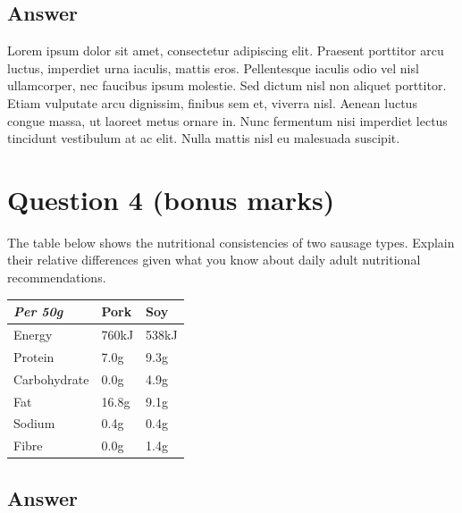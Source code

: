 \documentclass[
	12pt, %
]{fphw}
\begin{document}

\subsection*{Answer} 

Lorem ipsum dolor sit amet, consectetur adipiscing elit. Praesent porttitor arcu luctus, imperdiet urna iaculis, mattis eros. Pellentesque iaculis odio vel nisl ullamcorper, nec faucibus ipsum molestie. Sed dictum nisl non aliquet porttitor. Etiam vulputate arcu dignissim, finibus sem et, viverra nisl. Aenean luctus congue massa, ut laoreet metus ornare in. Nunc fermentum nisi imperdiet lectus tincidunt vestibulum at ac elit. Nulla mattis nisl eu malesuada suscipit.


\section*{Question 4 (bonus marks)}

\begin{problem}
	The table below shows the nutritional consistencies of two sausage types. Explain their relative differences given what you know about daily adult nutritional recommendations.
	
	\bigskip
    
	\begin{center}
		\begin{tabular}{l l l}
			\toprule
			\textit{Per 50g} & Pork & Soy \\
			\midrule
			Energy & 760kJ & 538kJ\\
			Protein & 7.0g & 9.3g\\
			Carbohydrate & 0.0g & 4.9g\\
			Fat & 16.8g & 9.1g\\
			Sodium & 0.4g & 0.4g\\
			Fibre & 0.0g & 1.4g\\
			\bottomrule
		\end{tabular}
	\end{center}
	
	\medskip
\end{problem}


\subsection*{Answer}
\end{document}
